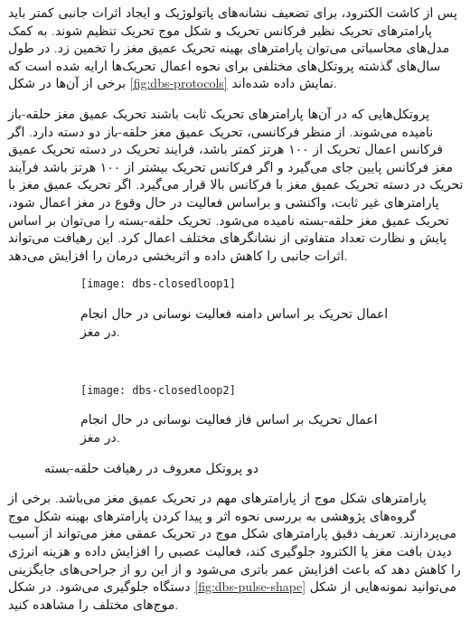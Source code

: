 پس از کاشت الکترود، برای تضعیف نشانه‌های پاتولوژیک و ایجاد اثرات جانبی کمتر باید پارامترهای تحریک نظیر فرکانس تحریک و شکل موج تحریک تنظیم شوند. به کمک مدل‌های محاسباتی می‌توان پارامترهای بهینه تحریک عمیق مغز را تخمین زد. در طول سال‌های گذشته پروتکل‌های مختلفی برای نحوه اعمال تحریک‌ها ارایه شده است که برخی از آن‌ها در شکل
\ref{fig:dbs-protocols}
نمایش داده شده‌اند. 

پروتکل‌هایی که در آن‌ها پارامترهای تحریک ثابت باشند تحریک عمیق مغز حلقه-باز نامیده می‌شوند.
 از منظر فرکانسی، تحریک عمیق مغز حلقه-باز دو دسته دارد. اگر فرکانس اعمال تحریک از ۱۰۰ هرتز کمتر باشد، فرایند تحریک در دسته تحریک عمیق مغز فرکانس پایین جای می‌گیرد و اگر فرکانس تحریک بیشتر از ۱۰۰ هرتز باشد فرآیند تحریک در دسته تحریک عمیق مغز با فرکانس بالا قرار می‌گیرد. اگر تحریک عمیق مغز با پارامتر‌های غیر ثابت، واکنشی و براساس فعالیت در حال وقوع در مغز اعمال شود، تحریک عمیق مغز حلقه-بسته نامیده می‌شود. تحریک حلقه-بسته را می‌توان بر اساس  پایش و نظارت تعداد متفاوتی از نشانگرهای مختلف اعمال کرد. این رهیافت می‌تواند اثرات جانبی را کاهش داده و اثربخشی درمان را افزایش می‌دهد.
 
\begin{figure}[t!]
     \centering
     \begin{subfigure}[t]{0.45\textwidth}
         \centering
         \texttt{[image: dbs-closedloop1]}
         \caption{
 اعمال تحریک بر اساس دامنه فعالیت نوسانی در حال انجام در مغز.
         }
     \end{subfigure}
     \
     \begin{subfigure}[t]{0.45\textwidth}
         \centering
         \texttt{[image: dbs-closedloop2]}
         \caption{
 اعمال تحریک بر اساس فاز فعالیت نوسانی در حال انجام در مغز.
         }
     \end{subfigure}
        \caption{
دو پروتکل معروف در رهیافت حلقه-بسته
         }
        \label{fig:dbs-closed-loop}
\end{figure}



پارامترهای شکل موج از پارامترهای مهم در تحریک عمیق مغز می‌باشد. برخی از گروه‌های پژوهشی به بررسی نحوه اثر و پیدا کردن پارامترهای بهینه شکل موج می‌پردازند. تعریف دقیق پارامترهای شکل موج در تحریک عمقی مغز می‌تواند از آسیب دیدن بافت مغز یا الکترود جلوگیری کند، فعالیت عصبی را افزایش داده و هزینه انرژی را کاهش دهد که باعث افزایش عمر باتری می‌شود و از این رو از جراحی‌های جایگزینی دستگاه جلوگیری می‌شود. در شکل 
\ref{fig:dbs-pulse-shape}
می‌توانید نمونه‌هایی از شکل موج‌های مختلف را مشاهده کنید. 


